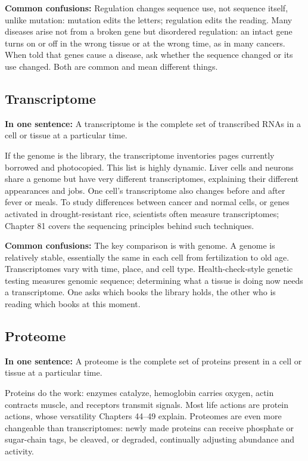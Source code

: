 \textbf{Common confusions:} Regulation changes sequence use, not sequence itself, unlike mutation: mutation edits the letters; regulation edits the reading. Many diseases arise not from a broken gene but disordered regulation: an intact gene turns on or off in the wrong tissue or at the wrong time, as in many cancers. When told that genes cause a disease, ask whether the sequence changed or its use changed. Both are common and mean different things.

\subsection{Transcriptome}

\textbf{In one sentence:} A transcriptome is the complete set of transcribed RNAs in a cell or tissue at a particular time.

If the genome is the library, the transcriptome inventories pages currently borrowed and photocopied. This list is highly dynamic. Liver cells and neurons share a genome but have very different transcriptomes, explaining their different appearances and jobs. One cell's transcriptome also changes before and after fever or meals. To study differences between cancer and normal cells, or genes activated in drought-resistant rice, scientists often measure transcriptomes; Chapter 81 covers the sequencing principles behind such techniques.

\textbf{Common confusions:} The key comparison is with genome. A genome is relatively stable, essentially the same in each cell from fertilization to old age. Transcriptomes vary with time, place, and cell type. Health-check-style genetic testing measures genomic sequence; determining what a tissue is doing now needs a transcriptome. One asks which books the library holds, the other who is reading which books at this moment.

\subsection{Proteome}

\textbf{In one sentence:} A proteome is the complete set of proteins present in a cell or tissue at a particular time.

Proteins do the work: enzymes catalyze, hemoglobin carries oxygen, actin contracts muscle, and receptors transmit signals. Most life actions are protein actions, whose versatility Chapters 44--49 explain. Proteomes are even more changeable than transcriptomes: newly made proteins can receive phosphate or sugar-chain tags, be cleaved, or degraded, continually adjusting abundance and activity.


